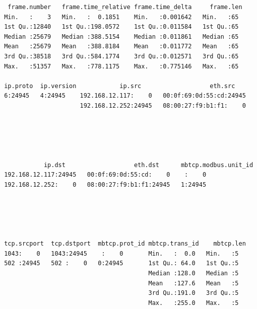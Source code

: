 \documentclass[12pt,]{article}
\begin{document}
\begin{verbatim}
  frame.number   frame.time_relative frame.time_delta     frame.len 
 Min.   :    3   Min.   :  0.1851    Min.   :0.001642   Min.   :65  
 1st Qu.:12840   1st Qu.:198.0572    1st Qu.:0.011584   1st Qu.:65  
 Median :25679   Median :388.5154    Median :0.011861   Median :65  
 Mean   :25679   Mean   :388.8184    Mean   :0.011772   Mean   :65  
 3rd Qu.:38518   3rd Qu.:584.1774    3rd Qu.:0.012571   3rd Qu.:65  
 Max.   :51357   Max.   :778.1175    Max.   :0.775146   Max.   :65  
                                                                    
 ip.proto  ip.version            ip.src                   eth.src     
 6:24945   4:24945    192.168.12.117:    0   00:0f:69:0d:55:cd:24945  
                      192.168.12.252:24945   08:00:27:f9:b1:f1:    0  
                                                                      
                                                                      
                                                                      
                                                                      
                                                                      
            ip.dst                   eth.dst      mbtcp.modbus.unit_id
 192.168.12.117:24945   00:0f:69:0d:55:cd:    0    :    0             
 192.168.12.252:    0   08:00:27:f9:b1:f1:24945   1:24945             
                                                                      
                                                                      
                                                                      
                                                                      
                                                                      
 tcp.srcport  tcp.dstport  mbtcp.prot_id mbtcp.trans_id    mbtcp.len
 1043:    0   1043:24945    :    0       Min.   :  0.0   Min.   :5  
 502 :24945   502 :    0   0:24945       1st Qu.: 64.0   1st Qu.:5  
                                         Median :128.0   Median :5  
                                         Mean   :127.6   Mean   :5  
                                         3rd Qu.:191.0   3rd Qu.:5  
                                         Max.   :255.0   Max.   :5  
                                                                    

\end{verbatim}
\end{document}
